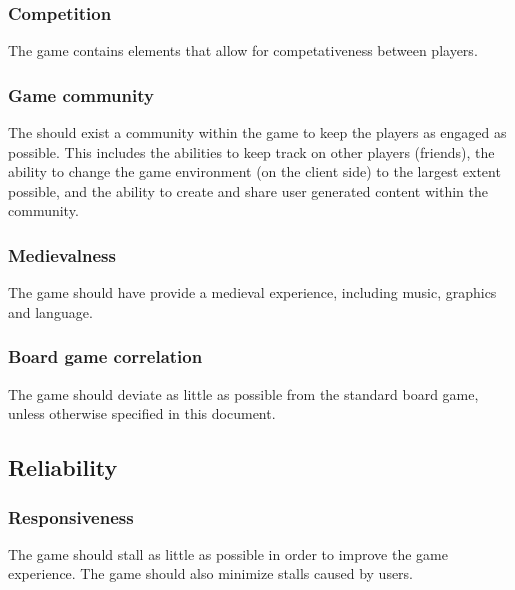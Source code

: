 \subsubsection{Competition}
\label{req:competition}
The game contains elements that allow for competativeness between players.


\subsubsection{Game community}
The should exist a community within the game to keep the players as engaged as possible. This includes the abilities to keep track on other players (friends), the ability to change the game environment (on the client side) to the largest extent possible, and the ability to create and share user generated content within the community.


\subsubsection{Medievalness}
The game should have provide a medieval experience, including music, graphics and language.


\subsubsection{Board game correlation}
\label{req:boardgamecorrelation}
The game should deviate as little as possible from the standard board game, unless otherwise specified in this document.


\subsection{Reliability}
\subsubsection{Responsiveness}
The game should stall as little as possible in order to improve the game experience. The game should also minimize stalls caused by users.

